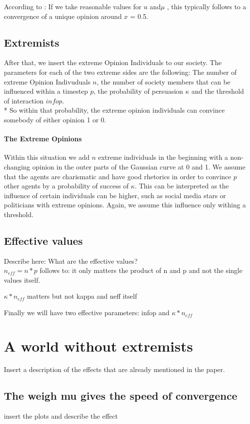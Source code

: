 \documentclass[11pt]{article}
\begin{document}
According to \cite{Minor}: If we take reasonable values for $u$ and$\mu$ , this typically follows to a convergence of a unique opinion around $x$ = 0.5.


\subsection{Extremists}
After that, we insert the extreme Opinion Individuals to our society. The parameters for each of the two extreme sides are the following: The number of extreme Opinion Indivuduals $n$, the number of society members that can be influenced within a timestep $p$, the probability of persuasion $\kappa$ and the threshold of interaction $infop$. \\*
So within that probability, the extreme opinion individuals can convince somebody of either opinion 1 or 0.

\paragraph{The Extreme Opinions}
Within this situation we add $n$ extreme individuals in the beginning with a non-changing opinion in the outer parts of the Gaussian curve at 0 and 1. We assume that the agents are charismatic and have good rhetorics in order to convince $p$ other agents by a probability of success of $\kappa$. This can be interpreted as the influence of certain individuals can be higher, such as social media stars or politicians with extreme opinions. Again, we assume this influence only withing a threshold.

\subsection{Effective values}
Describe here: What are the effective values? \\
$n_{eff} = n*p$ follows to: it only matters the product of n and p and not the single values itself.

$\kappa*n_{eff}$ matters but not kappa and neff itself

Finally we will have two effective parameters: infop and $\kappa*n_{eff}$

\section{A world without extremists}
Insert a description of the effects that are already mentioned in the paper.

\subsection{The weigh mu gives the speed of convergence}
insert the plots and describe the effect
\end{document}

